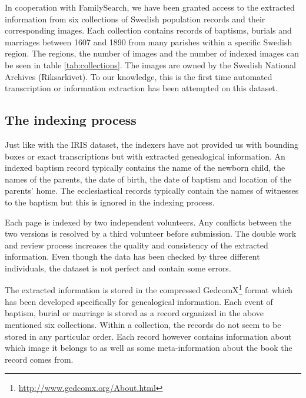 

In cooperation with FamilySearch, we have been granted access to the extracted information from six collections of Swedish population records and their corresponding images.
Each collection contains records of baptisms, burials and marriages between 1607 and 1890 from many parishes within a specific Swedish region.
The regions, the number of images and the number of indexed images can be seen in table \ref{tab:collections}.
The images are owned by the Swedish National Archives (Riksarkivet).
To our knowledge, this is the first time automated transcription or information extraction has been attempted on this dataset.



\subsection{The indexing process}

Just like with the IRIS dataset, the indexers have not provided us with bounding boxes or exact transcriptions but with extracted genealogical information. An indexed baptism record typically contains the name of the newborn child, the names of the parents, the date of birth, the date of baptism and location of the parents' home. The ecclesiastical records typically contain the names of witnesses to the baptism but this is ignored in the indexing process.

Each page is indexed by two independent volunteers. Any conflicts between the two versions is resolved by a third volunteer before submission.
The double work and review process increases the quality and consistency of the extracted information. Even though the data has been checked by three different individuals, the dataset is not perfect and contain some errors.

The extracted information is stored in the compressed GedcomX\footnote{\url{http://www.gedcomx.org/About.html}} format which has been developed specifically for genealogical information.
Each event of baptism, burial or marriage is stored as a record organized in the above mentioned six collections. Within a collection, the records do not seem to be stored in any particular order. Each record however contains information about which image it belongs to as well as some meta-information about the book the record comes from.

